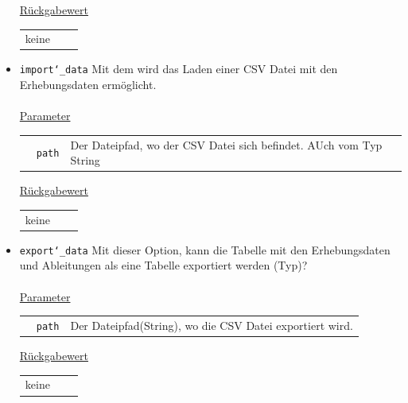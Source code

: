 \documentclass{article}
\begin{document}
\begin{itemize}
\underline{{Rückgabewert}}
\begin{tabular}{lll}
 keine \\
\end{tabular}

\item \texttt{import\char`_data} \newline Mit dem wird das Laden einer CSV Datei mit den Erhebungsdaten ermöglicht.
\\\\
\underline{{Parameter}}
\begin{tabular}{lll}
 & \texttt{path} & Der Dateipfad, wo der CSV Datei sich befindet. AUch vom Typ String \\
\end{tabular}

\underline{{Rückgabewert}}
\begin{tabular}{lll}
 keine \\
\end{tabular}

\item \texttt{export\char`_data} \newline Mit dieser Option, kann die Tabelle mit den Erhebungsdaten und Ableitungen als eine  Tabelle exportiert werden (Typ)?
\\\\
\underline{{Parameter}}
\begin{tabular}{lll}
 & \texttt{path} & Der Dateipfad(String), wo die CSV Datei exportiert wird. \\
\end{tabular}

\underline{{Rückgabewert}}
\begin{tabular}{lll}
 keine \\
\end{tabular}
\end{itemize}
\end{document}
